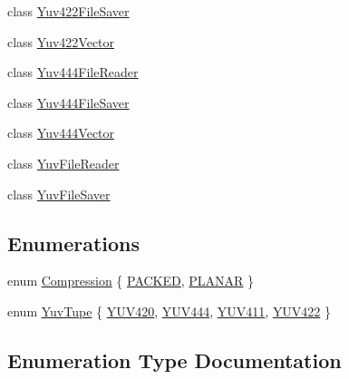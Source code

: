 \begin{DoxyCompactItemize}
\item 
class \hyperlink{classUtility_1_1Yuv422FileSaver}{Yuv422\+File\+Saver}
\item 
class \hyperlink{classUtility_1_1Yuv422Vector}{Yuv422\+Vector}
\item 
class \hyperlink{classUtility_1_1Yuv444FileReader}{Yuv444\+File\+Reader}
\item 
class \hyperlink{classUtility_1_1Yuv444FileSaver}{Yuv444\+File\+Saver}
\item 
class \hyperlink{classUtility_1_1Yuv444Vector}{Yuv444\+Vector}
\item 
class \hyperlink{classUtility_1_1YuvFileReader}{Yuv\+File\+Reader}
\item 
class \hyperlink{classUtility_1_1YuvFileSaver}{Yuv\+File\+Saver}
\end{DoxyCompactItemize}
\subsection*{Enumerations}
\begin{DoxyCompactItemize}
\item 
enum \hyperlink{namespaceUtility_a56a83bf6847f4801f4205eb4be237ccf}{Compression} \{ \hyperlink{namespaceUtility_a56a83bf6847f4801f4205eb4be237ccfa8f626cb9c789e0dd4b7c9dad49465938}{P\+A\+C\+K\+E\+D}, 
\hyperlink{namespaceUtility_a56a83bf6847f4801f4205eb4be237ccfa50babda0470ecef96fd4d586825f0c7c}{P\+L\+A\+N\+A\+R}
 \}
\item 
enum \hyperlink{namespaceUtility_a520f1ae4d0d357b9451581813f645921}{Yuv\+Tupe} \{ \hyperlink{namespaceUtility_a520f1ae4d0d357b9451581813f645921acb52b4d8e199d901af27ee1f2d6bcb04}{Y\+U\+V420}, 
\hyperlink{namespaceUtility_a520f1ae4d0d357b9451581813f645921a523b094e008f914e9e01af828090df0c}{Y\+U\+V444}, 
\hyperlink{namespaceUtility_a520f1ae4d0d357b9451581813f645921a74f2a458ec2ec843a0ce367142039045}{Y\+U\+V411}, 
\hyperlink{namespaceUtility_a520f1ae4d0d357b9451581813f645921af95cc5446c6345daadf349ccd299a2f5}{Y\+U\+V422}
 \}
\end{DoxyCompactItemize}


\subsection{Enumeration Type Documentation}
\hypertarget{namespaceUtility_a56a83bf6847f4801f4205eb4be237ccf}{}
